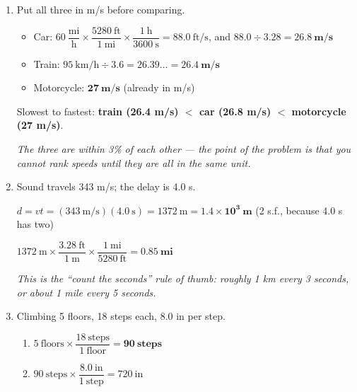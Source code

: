 \documentclass[12pt, twoside]{article}
\begin{document}
\begin{enumerate}[itemsep=0.35cm]
\begin{enumerate}[itemsep=0.35cm]
      \emph{Either route works. Going through kilometers:
      $95 \times 1.61 = 153~\text{km/h}$, and $153 \div 3.6 = 42.5~\text{m/s}$.
      Note the full-precision 139.33 was carried into part (b) --- rounding to 139 first
      still gives 42.4, close but not identical. Round only at the end.}
  \end{enumerate}

\item Put all three in m/s before comparing.
  \begin{itemize}[itemsep=0.2cm]
    \item Car: $60~\dfrac{\text{mi}}{\text{h}} \times \dfrac{5280~\text{ft}}{1~\text{mi}}
      \times \dfrac{1~\text{h}}{3600~\text{s}} = 88.0~\text{ft/s}$, and
      $88.0 \div 3.28 = \mathbf{26.8~\textbf{m/s}}$
    \item Train: $95~\text{km/h} \div 3.6 = 26.39\ldots = \mathbf{26.4~\textbf{m/s}}$
    \item Motorcycle: $\mathbf{27~\textbf{m/s}}$ (already in m/s)
  \end{itemize}
  \vspace{0.2cm}
  Slowest to fastest: \textbf{train (26.4 m/s) $<$ car (26.8 m/s) $<$ motorcycle (27 m/s)}.

  \emph{The three are within 3\% of each other --- the point of the problem is that you
  cannot rank speeds until they are all in the same unit.}

\newpage

\item Sound travels 343 m/s; the delay is 4.0 s.

  $d = vt = (343~\text{m/s})(4.0~\text{s}) = 1372~\text{m} = \mathbf{1.4 \times 10^{3}~\textbf{m}}$
  \quad (2 s.f., because 4.0 s has two)

  $1372~\text{m} \times \dfrac{3.28~\text{ft}}{1~\text{m}} \times \dfrac{1~\text{mi}}{5280~\text{ft}}
  = \mathbf{0.85~\textbf{mi}}$

  \emph{This is the ``count the seconds'' rule of thumb: roughly 1 km every 3 seconds,
  or about 1 mile every 5 seconds.}

\item Climbing 5 floors, 18 steps each, 8.0 in per step.
  \begin{enumerate}[itemsep=0.3cm]
    \item $5~\text{floors} \times \dfrac{18~\text{steps}}{1~\text{floor}} = \mathbf{90~\textbf{steps}}$
    \item $90~\text{steps} \times \dfrac{8.0~\text{in}}{1~\text{step}} = 720~\text{in}$


\end{enumerate}
\end{enumerate}
\end{document}
